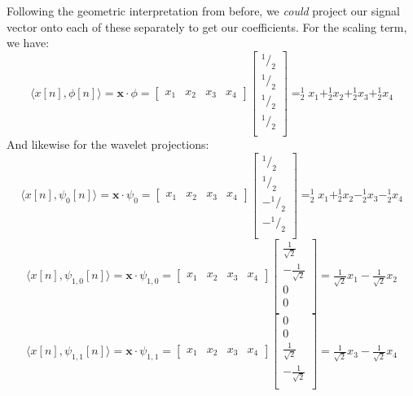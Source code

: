 \documentclass[letterpaper]{article}
\begin{document}
Following the geometric interpretation from before,
we \emph{could} project our signal vector onto each of these separately to get our coefficients.
For the scaling term, we have:
\[
\langle x[n],\phi[n] \rangle = \mathbf{x}\cdot\phi = 
\begin{bmatrix}
x_1 & x_2 & x_3 & x_4
\end{bmatrix}
\begin{bmatrix}
^1/_2 \\
^1/_2 \\
^1/_2 \\
^1/_2 \\
\end{bmatrix}
= ^1_2 x_1 + ^1_2 x_2 + ^1_2 x_3 + ^1_2 x_4
\]
And likewise for the wavelet projections:
\[
\langle x[n],\psi_{0}[n] \rangle = \mathbf{x}\cdot\psi_{0} = 
\begin{bmatrix}
x_1 & x_2 & x_3 & x_4
\end{bmatrix}
\begin{bmatrix}
^1/_2 \\
^1/_2 \\
-^1/_2 \\
-^1/_2 \\
\end{bmatrix}
= ^1_2 x_1 + ^1_2 x_2 - ^1_2 x_3 - ^1_2 x_4
\]
\[
\langle x[n],\psi_{1,0}[n] \rangle = \mathbf{x}\cdot\psi_{1,0} = 
\begin{bmatrix}
x_1 & x_2 & x_3 & x_4
\end{bmatrix}
\begin{bmatrix}
\tfrac{1}{\sqrt{2}} \\
-\tfrac{1}{\sqrt{2}} \\
0 \\
0 \\
\end{bmatrix}
= \tfrac{1}{\sqrt{2}} x_1 -\tfrac{1}{\sqrt{2}} x_2
\]
\[
\langle x[n],\psi_{1,1}[n] \rangle = \mathbf{x}\cdot\psi_{1,1} = 
\begin{bmatrix}
x_1 & x_2 & x_3 & x_4
\end{bmatrix}
\begin{bmatrix}
0 \\
0 \\
\tfrac{1}{\sqrt{2}} \\
-\tfrac{1}{\sqrt{2}} \\
\end{bmatrix}
= \tfrac{1}{\sqrt{2}} x_3 - \tfrac{1}{\sqrt{2}} x_4
\]
\end{document}
